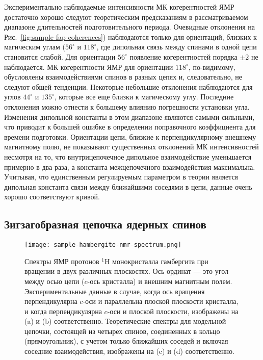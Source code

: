Экспериментально наблюдаемые интенсивности МК когерентностей ЯМР достаточно хорошо следуют теоретическим предсказаниям
в рассматриваемом диапазоне длительностей подготовительного периода.
Очевидные отклонения на Рис.~\ref{fig:sample-fap-coherences}) наблюдаются только для ориентаций,
близких к магическим углам ($56^\circ$ и $118^\circ$,
где дипольная связь между спинами в одной цепи становится слабой.
Для ориентации $56^\circ$ появление когерентностей порядка $\pm2$ не наблюдается.
МК когерентности  ЯМР для ориентации $118^\circ$,
по-видимому, обусловлены взаимодействиями спинов в разных цепях и, следовательно, не следуют общей тенденции.
Некоторые небольшие отклонения наблюдаются для углов $44^\circ$ и $135^\circ$,
которые все еще близки к магическому углу.
Последние отклонения можно отнести к большему влиянию погрешности установки угла.
Изменения дипольной константы в этом диапазоне являются самыми сильными,
что приводит к большей ошибке в определении поправочного коэффициента для времени подготовки.
Ориентации цепи, близкие к перпендикулярному внешнему магнитному полю,
не показывают существенных отклонений МК интенсивностей несмотря на то,
что внутрицепочечное дипольное взаимодействие уменьшается примерно в два раза,
а константа межцепочечного взаимодействия максимальна.
Учитывая, что единственным регулируемым параметром в теории является дипольная константа связи
между ближайшими соседями в цепи, данные очень хорошо соответствуют кривой.




\subsection{Зигзагобразная цепочка ядерных спинов}
\label{sec:model-zigzag-chain}

\begin{figure}
  \centering
  \texttt{[image: sample-hambergite-nmr-spectrum.png]}
  \caption{
    Спектры ЯМР протонов $^1$H монокристалла гамбергита при вращении в двух различных плоскостях.
    Ось ординат --- это угол между осью цепи ($c$-ось кристалла) и внешним магнитным полем.
    Экспериментальные данные в случае, когда
    ось вращения перпендикулярна $c$-оси и параллельна плоской плоскости кристалла,
    и когда перпендикулярна $c$-оси и плоской плоскости,
    изображены на (a) и (b) соответственно.
    Теоретические спектры для модельной цепочки,
    состоящей из четырех спинов, соединенных в кольцо (прямоугольник),
    с учетом только ближайших соседей и включая соседние взаимодействия,
    изображены на (c) и (d) соответственно.
  }
  \label{fig:sample-hambergite-nmr-spectrum}
\end{figure}

